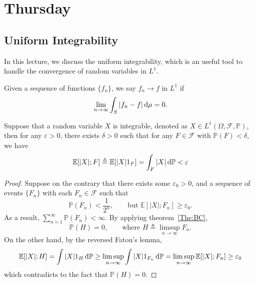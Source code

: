 

\section{Thursday}

\subsection{Uniform Integrability}
In this lecture, we discuss the uniform integrability, which is an useful tool to handle the convergence of random variables in $L^1$.
\begin{definition}[$L_1$-convergence]
Given a sequence of functions $\{f_n\}$, 
we say $f_n\to f$ in $L^1$ if
\[
\lim_{n\to\infty}\int_S|f_n-f|\,\mathrm{d}\mu=0.
\]
\end{definition}


\begin{proposition}\label{Pro:3:1}
Suppose that a random variable $X$ is integrable, denoted as $X\in L^1(\Omega,\mathcal{F},\mathbb{P})$, then 
for any $\varepsilon>0$, there exists $\delta>0$ such that for any $F\in\mathcal{F}$ with $\mathbb{P}(F)<\delta$, we have
\[
\mathbb{E}[|X|;F]\triangleq\mathbb{E}[|X|1_F]=\int_F|X|\,\mathrm{d}\mathbb{P}<\varepsilon
\]
\end{proposition}
\begin{proof}
Suppose on the contrary that there exists some $\varepsilon_0>0$, and a sequence of events $\{F_n\}$ with each $F_n\in\mathcal{F}$ such that
\[
\mathbb{P}(F_n)<\frac{1}{2^n},\qquad\text{but }
\mathbb{E}[|X|;F_n]\ge\varepsilon_0.
\]
As a result, $\sum_{n=1}^\infty\mathbb{P}(F_n)<\infty$. By applying theorem~\ref{The:BC}, 
\[
\mathbb{P}(H)=0,\qquad
\text{where }
H\triangleq 
\limsup_{n\to\infty}F_n.
\]
On the other hand, by the reversed Fatou's lemma,
\[
\mathbb{E}[|X|;H]=
\int|X|1_H\,\mathrm{d}\mathbb{P}\ge \limsup_{n\to\infty}\int|X|1_{F_n}\,\mathrm{d}\mathbb{P}=
\limsup_{n\to\infty}\mathbb{E}[|X|;F_n]\ge\varepsilon_0
\]
which contradicts to the fact that $\mathbb{P}(H)=0$.
\end{proof}

